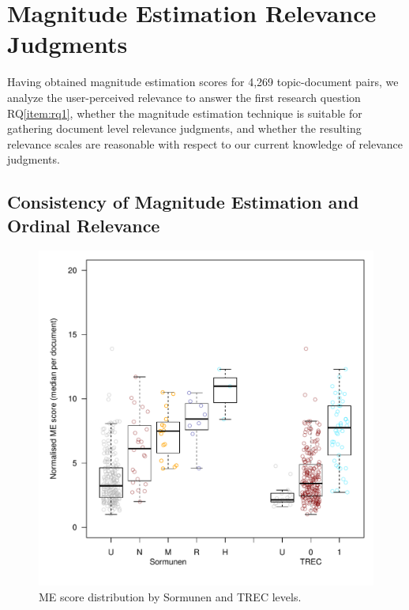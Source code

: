 
\section{Magnitude Estimation Relevance Judgments}
\label{sec-rq1}

Having obtained magnitude estimation scores for 4,269 topic-document
pairs, we analyze the user-perceived relevance to answer the first
research question RQ\ref{item:rq1}, whether the magnitude estimation
technique is suitable for gathering document level relevance
judgments, and whether the resulting relevance scales are reasonable
with respect to our current knowledge of relevance judgments.

\subsection{Consistency of Magnitude Estimation and Ordinal Relevance}
\label{sec:cons-magn-estim}

\begin{figure}[t]
  \centering
  \includegraphics[width=.7\linewidth,page=19]{figs/check_gross_ranks_med.pdf}
  \vspace{-0.5cm}
  \caption{ME score distribution by Sormunen and TREC levels.}
  \label{fig:ME-distribution}
\end{figure}


